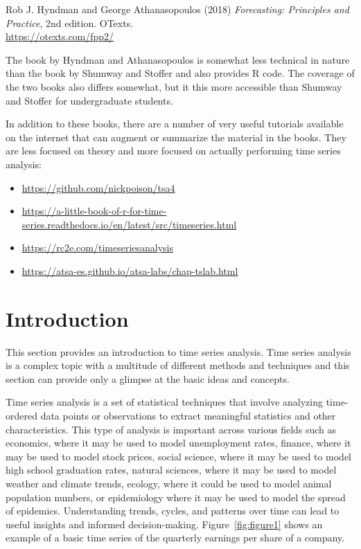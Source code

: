 \begin{resourcebox}
Rob J. Hyndman and George Athanasopoulos (2018) \emph{Forecasting: Principles and Practice}, 2nd edition. OTexts. \\

\url{https://otexts.com/fpp2/} 
\end{resourcebox}

The book by Hyndman and Athanasopoulos is somewhat less technical in nature than the book by Shumway and Stoffer and also provides R code. The coverage of the two books also differs somewhat, but it this more accessible than Shumway and Stoffer for undergraduate students.

\begin{resourcebox}
In addition to these books, there are a number of very useful tutorials available on the internet that can augment or summarize the material in the books. They are less focused on theory and more focused on actually performing time series analysis:\\

\begin{itemize}
\small
\item \url{https://github.com/nickpoison/tsa4}
\item \url{https://a-little-book-of-r-for-time-series.readthedocs.io/en/latest/src/timeseries.html}
\item \url{https://rc2e.com/timeseriesanalysis}
\item \url{https://atsa-es.github.io/atsa-labs/chap-tslab.html}
\normalsize
\end{itemize}
\end{resourcebox}

\section{Introduction}

This section provides an introduction to time series analysis. Time series analysis is a complex topic with a multitude of different methods and techniques and this section can provide only a glimpse at the basic ideas and concepts. 

Time series analysis is a set of statistical techniques that involve analyzing time-ordered data points or observations to extract meaningful statistics and other characteristics. This type of analysis is important across various fields such as economics, where it may be used to model unemployment rates, finance, where it may be used to model stock prices, social science, where it may be used to model high school graduation rates, natural sciences, where it may be used to model weather and climate trends, ecology, where it could be used to model animal population numbers, or epidemiology where it may be used to model the spread of epidemics. Understanding trends, cycles, and patterns over time can lead to useful insights and informed decision-making. Figure~\ref{fig:figure1} shows an example of a basic time series of the quarterly earnings per share of a company.

